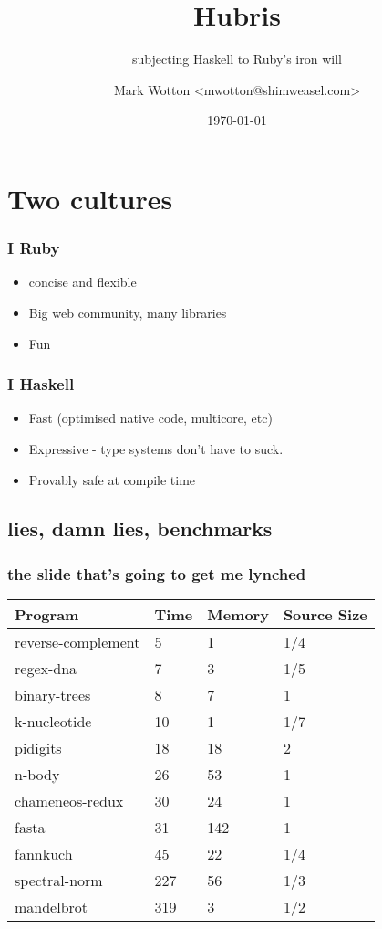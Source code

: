 \documentclass{beamer}
\title{Hubris}
\subtitle{subjecting Haskell to Ruby's iron will}
\author{Mark Wotton \textless mwotton@shimweasel.com\textgreater}
\date{\today}
\begin{document}
\lstset{language=Haskell}
\section{Two cultures}
\frame{\titlepage}

\begin{frame}
  \frametitle{I  Ruby}
  \begin{itemize}
  \item concise and flexible
  \item Big web community, many libraries
  \item Fun
  \end{itemize}
\end{frame}



\begin{frame} 
  \frametitle{I  Haskell}
  \begin{itemize}
  \item<1-> Fast (optimised native code, multicore, etc)
  \item<2-> Expressive - type systems don't have to suck.
  \item<3-> Provably safe at compile time
  \end{itemize}
\end{frame}


\subsection{lies, damn lies, benchmarks}
\begin{frame}
  \frametitle{the slide that's going to get me lynched}
  \begin{tabular}{l l l l} 
    Program &	        Time	&Memory &	Source Size\\ \hline
    reverse-complement	&5	&1	&1/4\\
    regex-dna	        &7	&3	&1/5\\	
    binary-trees	        &8	&7	&1	\\	
    k-nucleotide	        &10	&1	&1/7	\\	
    pidigits	        &18	&18	&2	\\	
    n-body	        &26	&53	&1	\\	
    chameneos-redux	&30	&24	&1	\\	
    fasta	                &31	&142	&1	\\	
    fannkuch	        &45	&22	&1/4	\\	
    spectral-norm	        &227	&56	&1/3	\\	
    mandelbrot	        &319	&3	&1/2\\	
  \end{tabular}
\end{frame}
\end{document}
